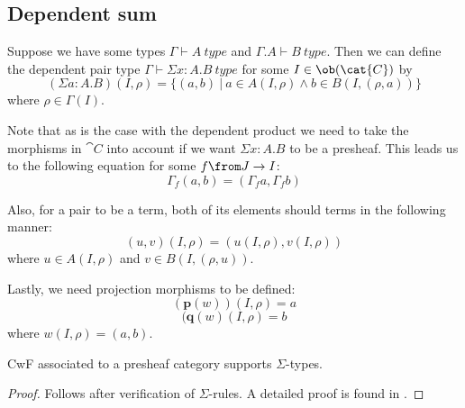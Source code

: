 \subsection*{Dependent sum}
Suppose we have some types $\Gamma \vdash A~type$ and $\Gamma.A \vdash B~type$.
Then we can define the dependent pair type $\Gamma \vdash \Sigma x:A.B~type$
for some $I \in \ob(\cat{C})$ by
\[
  (\Sigma a :A. B)(I, \rho) = \{(a, b)~|~a \in A(I, \rho) \land b \in B(I, (\rho, a))\}
\]
where $\rho \in \Gamma(I)$.

Note that as is the case with the dependent product we need to take the
morphisms in $\cat{C}$ into account if we want $\Sigma x:A.B$ to be a presheaf.
This leads us to the following equation for some $f \from J \to I$:
\[
  \Gamma_f(a, b) = (\Gamma_f a, \Gamma_f b)
\]

Also, for a pair to be a term, both of its elements should terms in the
following manner:
\[
  (u, v)(I, \rho) = (u(I, \rho), v(I, \rho))
\]
where $u \in A(I, \rho)$ and $v \in B(I, (\rho, u))$.

Lastly, we need projection morphisms to be defined:
\[
  (\mathbf{p}(w))(I, \rho) = a
\]
\[
  (\mathbf{q}(w)(I, \rho) = b
\]
where $w(I, \rho) = (a, b)$.

\begin{lemma}
  CwF associated to a presheaf category supports $\Sigma$-types.
  \begin{proof}
    Follows after verification of $\Sigma$-rules. A detailed proof is found in
    \cite{Hofmann}.
  \end{proof}
\end{lemma}





